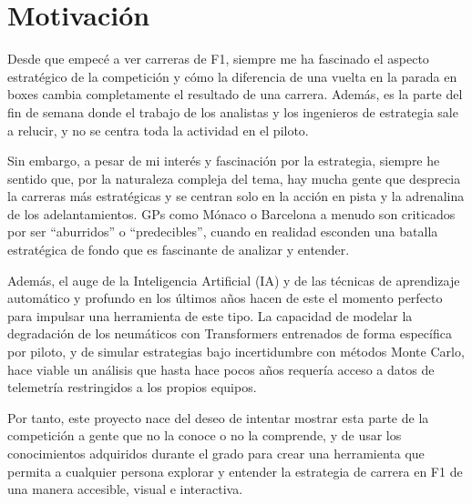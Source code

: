 \section{Motivación}
\label{sec:motivacion}


Desde que empecé a ver carreras de F1, siempre me ha fascinado el aspecto estratégico de la competición y cómo la diferencia de una vuelta en la parada en boxes cambia completamente el resultado de una carrera. Además, es la parte del fin de semana donde el trabajo de los analistas y los ingenieros de estrategia sale a relucir, y no se centra toda la actividad en el piloto. 

Sin embargo, a pesar de mi interés y fascinación por la estrategia, siempre he sentido que, por la naturaleza compleja del tema, hay mucha gente que desprecia la carreras más estratégicas y se centran solo en la acción en pista y la adrenalina de los adelantamientos. GPs como Mónaco o Barcelona a menudo son criticados por ser ``aburridos'' o ``predecibles'', cuando en realidad esconden una batalla estratégica de fondo que es fascinante de analizar y entender.

Además, el auge de la Inteligencia Artificial (IA) y de las técnicas de aprendizaje automático y profundo en los últimos años hacen de este el momento perfecto para impulsar una herramienta de este tipo. La capacidad de modelar la degradación de los neumáticos con Transformers entrenados de forma específica por piloto, y de simular estrategias bajo incertidumbre con métodos Monte Carlo, hace viable un análisis que hasta hace pocos años requería acceso a datos de telemetría restringidos a los propios equipos.

Por tanto, este proyecto nace del deseo de intentar mostrar esta parte de la competición a gente que no la conoce o no la comprende, y de usar los conocimientos adquiridos durante el grado para crear una herramienta que permita a cualquier persona explorar y entender la estrategia de carrera en F1 de una manera accesible, visual e interactiva.

